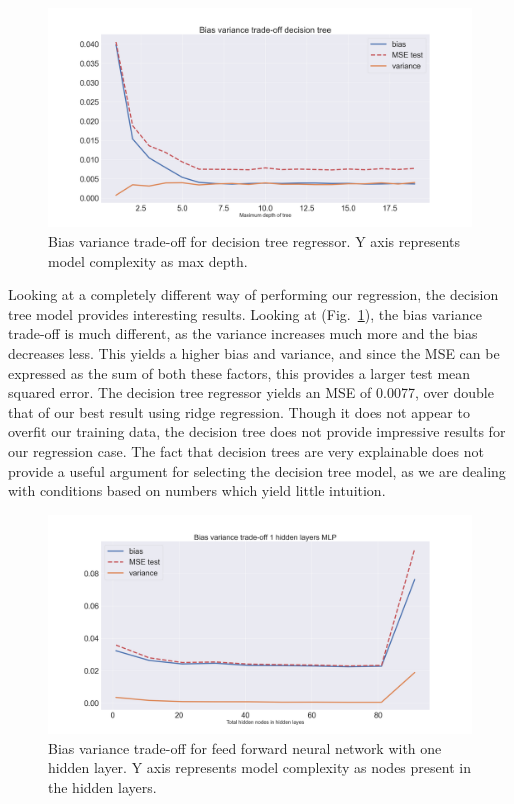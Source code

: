 \documentclass[onecolumn,10pt,cleanfoot]{asme2ej}
\begin{document}
\begin{figure}[H]
\centerline{\includegraphics[width=5in]{figs/BV_Decison_tree.png}}
\caption{Bias variance trade-off for decision tree regressor. Y axis represents model complexity as max depth.}
\label{tree}
\end{figure}

Looking at a completely different way of performing our regression, the decision tree model provides interesting results. Looking at (Fig.~\ref{tree}), the bias variance trade-off is much different, as the variance increases much more and the bias decreases less. This yields a higher bias and variance, and since the MSE can be expressed as the sum of both these factors, this provides a larger test mean squared error. The decision tree regressor yields an MSE of 0.0077, over double that of our best result using ridge regression. Though it does not appear to overfit our training data, the decision tree does not provide impressive results for our regression case. The fact that decision trees are very explainable does not provide a useful argument for selecting the decision tree model, as we are dealing with conditions based on numbers which yield little intuition.

\begin{figure}[H]
\centerline{\includegraphics[width=5in]{figs/BV_ffnn1.png}}
\caption{Bias variance trade-off for feed forward neural network with one hidden layer. Y axis represents model complexity as nodes present in the hidden layers.}
\label{ffnn1}
\end{figure}
\end{document}
